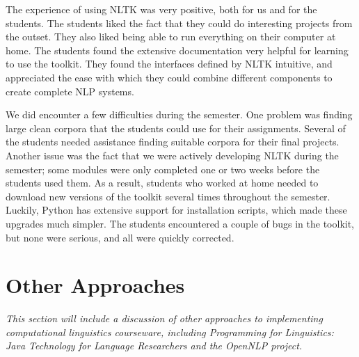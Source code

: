 \documentclass[11pt]{article}
\begin{document}


The experience of using NLTK was very positive, both for us and for
the students.  The students liked the fact that they could do
interesting projects from the outset.  They also liked being able to
run everything on their computer at home.  The students found the
extensive documentation very helpful for learning to use the toolkit.
They found the interfaces defined by NLTK intuitive, and appreciated
the ease with which they could combine different components to create
complete NLP systems.

We did encounter a few difficulties during the semester.  One problem
was finding large clean corpora that the students could use for their
assignments.  Several of the students needed assistance finding
suitable corpora for their final projects.  Another issue was the fact
that we were actively developing NLTK during the semester; some
modules were only completed one or two weeks before the students used
them.  As a result, students who worked at home needed to download new
versions of the toolkit several times throughout the semester.
Luckily, Python has extensive support for installation scripts, which
made these upgrades much simpler.  The students encountered a couple
of bugs in the toolkit, but none were serious, and all were quickly
corrected.

%

\section{Other Approaches}
\label{sec:approaches}

\textit{This section will include a discussion of other approaches to
implementing computational linguistics courseware, including
\emph{Programming for Linguistics: Java Technology for Language
Researchers}\cite{Hammond02} and \emph{the OpenNLP project}\cite{opennlp}.}
\end{document}
